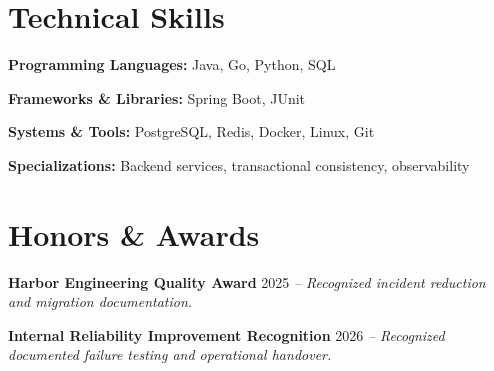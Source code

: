 \documentclass[11pt,a4paper]{article}
\begin{document}
\section{Technical Skills}
\textbf{Programming Languages:} Java, Go, Python, SQL

\textbf{Frameworks \& Libraries:} Spring Boot, JUnit

\textbf{Systems \& Tools:} PostgreSQL, Redis, Docker, Linux, Git

\textbf{Specializations:} Backend services, transactional consistency, observability

\section{Honors \& Awards}
\textbf{Harbor Engineering Quality Award} \hfill 2025 \textit{-- Recognized incident reduction and migration documentation.}

\textbf{Internal Reliability Improvement Recognition} \hfill 2026 \textit{-- Recognized documented failure testing and operational handover.}
\end{document}
